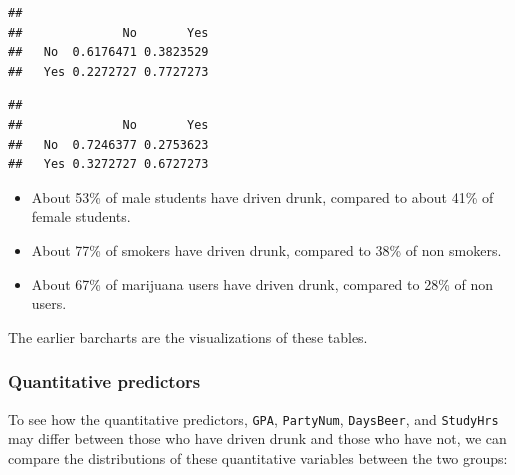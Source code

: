 \documentclass[
]{book}
\newenvironment{Shaded}{\begin{snugshade}}{\end{snugshade}}
\newcommand{\DecValTok}[1]{\textcolor[rgb]{0.00,0.00,0.81}{#1}}
\newcommand{\FunctionTok}[1]{\textcolor[rgb]{0.13,0.29,0.53}{\textbf{#1}}}
\newcommand{\NormalTok}[1]{#1}
\newcommand{\SpecialCharTok}[1]{\textcolor[rgb]{0.81,0.36,0.00}{\textbf{#1}}}
\providecommand{\tightlist}{%
  \setlength{\itemsep}{0pt}\setlength{\parskip}{0pt}}
\begin{document}
\begin{verbatim}
##      
##              No       Yes
##   No  0.6176471 0.3823529
##   Yes 0.2272727 0.7727273
\end{verbatim}

\begin{Shaded}
\end{Shaded}

\begin{verbatim}
##      
##              No       Yes
##   No  0.7246377 0.2753623
##   Yes 0.3272727 0.6727273
\end{verbatim}

\begin{itemize}
\tightlist
\item
  About 53\% of male students have driven drunk, compared to about 41\% of female students.
\item
  About 77\% of smokers have driven drunk, compared to 38\% of non smokers.
\item
  About 67\% of marijuana users have driven drunk, compared to 28\% of non users.
\end{itemize}

The earlier barcharts are the visualizations of these tables.

\hypertarget{quantitative-predictors}{%
\subsubsection*{Quantitative predictors}\label{quantitative-predictors}}

To see how the quantitative predictors, \texttt{GPA}, \texttt{PartyNum}, \texttt{DaysBeer}, and \texttt{StudyHrs} may differ between those who have driven drunk and those who have not, we can compare the distributions of these quantitative variables between the two groups:
\end{document}
